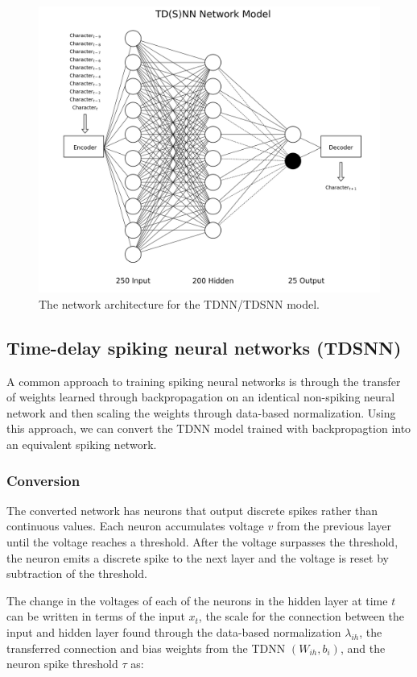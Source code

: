 \documentclass{article}
\begin{document}
\begin{figure}[H]
    \centering
    \includegraphics[width=0.9\linewidth]{../diagrams/tdnn.png}
    \caption{The network architecture for the TDNN/TDSNN model.}
    \label{fig:lstm-online-model}
\end{figure}

\subsection*{Time-delay spiking neural networks (TDSNN)}

A common approach to training spiking neural networks is through the transfer of weights learned through backpropagation on an identical non-spiking neural network and then scaling the weights through data-based normalization. Using this approach, we can convert the TDNN model trained with backpropagtion into an equivalent spiking network. \cite{rueckauer2017conversion}

\subsubsection*{Conversion}
The converted network has neurons that output discrete spikes rather than continuous values. Each neuron accumulates voltage $v$ from the previous layer until the voltage reaches a threshold. After the voltage surpasses the threshold, the neuron emits a discrete spike to the next layer and the voltage is reset by subtraction of the threshold. \cite{diehl2015fast} 

The change in the voltages of each of the neurons in the hidden layer at time $t$ can be written in terms of the input $x_t$, the scale for the connection between the input and hidden layer found through the data-based normalization $\lambda_{ih}$, the transferred connection and bias weights from the TDNN $\left(W_{ih}, b_{i}\right)$, and the neuron spike threshold $\tau$ as:
\end{document}
